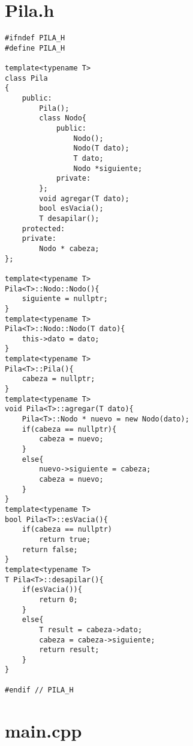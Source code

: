 \documentclass[a4paper,12pt]{article}
\begin{document}
\section{Pila.h}

\begin{lstlisting}
#ifndef PILA_H
#define PILA_H

template<typename T>
class Pila
{
    public:
        Pila();
        class Nodo{
            public:
                Nodo();
                Nodo(T dato);
                T dato;
                Nodo *siguiente;
            private:
        };
        void agregar(T dato);
        bool esVacia();
        T desapilar();
    protected:
    private:
        Nodo * cabeza;
};

template<typename T>
Pila<T>::Nodo::Nodo(){
    siguiente = nullptr;
}
template<typename T>
Pila<T>::Nodo::Nodo(T dato){
    this->dato = dato;
}
template<typename T>
Pila<T>::Pila(){
    cabeza = nullptr;
}
template<typename T>
void Pila<T>::agregar(T dato){
    Pila<T>::Nodo * nuevo = new Nodo(dato);
    if(cabeza == nullptr){
        cabeza = nuevo;
    }
    else{
        nuevo->siguiente = cabeza;
        cabeza = nuevo;
    }
}
template<typename T>
bool Pila<T>::esVacia(){
    if(cabeza == nullptr)
        return true;
    return false;
}
template<typename T>
T Pila<T>::desapilar(){
    if(esVacia()){
        return 0;
    }
    else{
        T result = cabeza->dato;
        cabeza = cabeza->siguiente;
        return result;
    }
}

#endif // PILA_H

\end{lstlisting}

\section{main.cpp}
\end{document}

